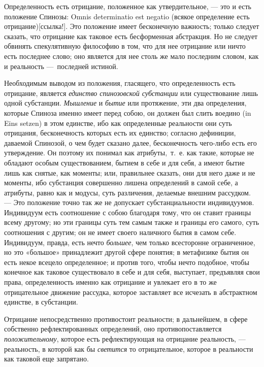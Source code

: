 Определенность есть отрицание, положенное как утвердительное, — это и есть
положение Спинозы: Omnis determinatio est negatio (всякое определение есть
отрицание)[ссылка!]. Это положение имеет
бесконечную важность; только следует сказать, что отрицание как таковое
есть бесформенная абстракция. Но не следует обвинять спекулятивную
философию в том, что для нее отрицание или ничто есть последнее слово; оно
является для нее столь же мало последним словом, как и реальность
—~последней истиной.

Необходимым выводом из положения, гласящего, что определенность есть
отрицание, является {\em единство спинозовской
субстанции} или существование лишь одной субстанции.
{\em Мышление} и {\em бытие} или
протяжение, эти два определения, которые Спиноза именно имеет перед собою,
он должен был слить воедино (in Eins setzen) в этом единстве, ибо как
определенные реальности они суть отрицания, бесконечность которых есть их
единство; согласно дефиниции, даваемой Спинозой, о чем будет сказано далее,
бесконечность чего-либо есть его утверждение. Он поэтому их понимал как
атрибуты,~т.~е. как такие, которые не обладают особым существованием,
бытием в себе и для себя, а имеют бытие лишь как снятые, как моменты; или,
правильнее сказать, они для него даже и не моменты, ибо субстанция
совершенно лишена определений в самой себе, а атрибуты, равно как и модусы,
суть различения, делаемые внешним рассудком. — Это положение точно так же
не допускает субстанциальности индивидуумов. Индивидуум есть соотношение с
собою благодаря тому, что он ставит границы всему другому; но эти границы
суть тем самым также и границы его самого, суть соотношения с другим; он не
имеет своего наличного бытия в самом себе. Индивидуум, правда, есть нечто
{\em большее}, чем только всесторонне ограниченное, но
это «большое» принадлежит другой сфере понятия; в метафизике бытия он есть
некое всецело определенное; и против того, чтобы нечто подобное, чтобы
конечное как таковое существовало в себе и для себя, выступает, предъявляя
свои права, определенность именно как отрицание и увлекает его в то же
отрицательное движение рассудка, которое заставляет все исчезать в
абстрактном единстве, в субстанции.

Отрицание непосредственно противостоит реальности; в дальнейшем, в сфере
собственно рефлектированных определений, оно противопоставляется
{\em положительному}, которое есть рефлектирующая на
отрицание реальность, — реальность, в которой как бы
{\em светится} то отрицательное, которое в реальности
как таковой еще запрятано.

